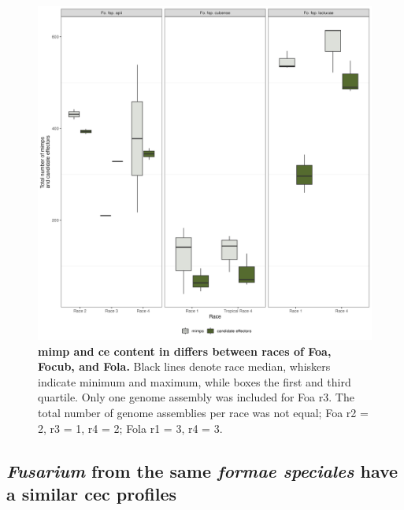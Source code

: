 \begin{figure}[ht!]
    \centering
    \includegraphics[width=\textwidth]{Figures/MimpsAndCandEffs_FspOfInterest.png}
    \caption[Boxplot of \ac{ce} and \ac{mimp} content in difference races of \ac{Foa}, \ac{Focub}, and \ac{Fola}.]{\textbf{\Acf{mimp} and \acf{ce} content in differs between races of \ac{Foa}, \ac{Focub}, and \ac{Fola}.} Black lines denote race median, whiskers indicate minimum and maximum, while boxes the first and third quartile. Only one genome assembly was included for \ac{Foa} \ac{r3}. The total number of genome assemblies per race was not equal; \ac{Foa} \ac{r2} = 2, \ac{r3} = 1, \ac{r4} = 2; \ac{Fola} \ac{r1} = 3, \ac{r4} = 3.}
    \label{fig:MaeiBoxPlot}
\end{figure}

\subsection{\textit{Fusarium} from the same \textit{formae speciales} have a similar \acl{cec} profiles}

